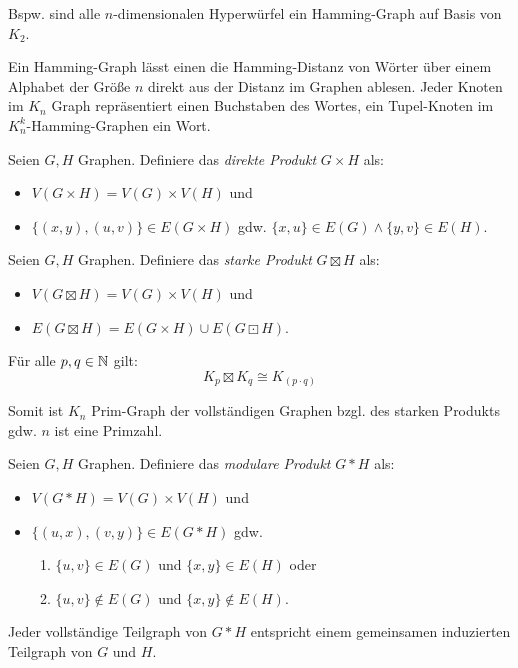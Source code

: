 \begin{remark}
    Bspw. sind alle $ n $-dimensionalen Hyperwürfel ein Hamming-Graph auf Basis von $ K_2 $.

    Ein Hamming-Graph lässt einen die Hamming-Distanz von Wörter über einem Alphabet der Größe $ n $ direkt aus der Distanz im Graphen ablesen.
    Jeder Knoten im $ K_n $ Graph repräsentiert einen Buchstaben des Wortes, ein Tupel-Knoten im $ K_n^k $-Hamming-Graphen ein Wort.
\end{remark}

\begin{definition}
    Seien $ G, H $ Graphen.
    Definiere das \textit{direkte Produkt} $ G \times H $ als:
    \begin{itemize}
        \item $ V(G \times H) = V(G) \times V(H) $ und
        \item $ \{ (x, y), (u, v) \} \in E(G \times H) $ gdw. $ \{ x, u\} \in E(G) \land \{ y, v \} \in E(H) $.
    \end{itemize}
\end{definition}

\begin{definition}
    Seien $ G, H $ Graphen.
    Definiere das \textit{starke Produkt} $ G \boxtimes H $ als:
    \begin{itemize}
        \item $ V(G \boxtimes H) = V(G) \times V(H) $ und
        \item $ E(G \boxtimes H) = E(G \times H) \cup E(G \boxdot H) $.
    \end{itemize}
\end{definition}

\begin{proposition}
    Für alle $ p, q \in \mathbb{N} $ gilt:
    \begin{equation*}
        K_p \boxtimes K_q \cong K_{(p \cdot q)}
    \end{equation*}

    Somit ist $ K_n $ Prim-Graph der vollständigen Graphen bzgl. des starken Produkts gdw. $ n $ ist eine Primzahl.
\end{proposition}

\begin{definition}
    Seien $ G, H $ Graphen.
    Definiere das \textit{modulare Produkt} $ G * H $ als:
    \begin{itemize}
        \item $ V(G * H) = V(G) \times V(H) $ und
        \item $ \{ (u, x), (v, y) \} \in E(G * H) $ gdw.
        \begin{enumerate}
            \item $ \{ u, v \} \in E(G) $ und $ \{ x, y \} \in E(H) $ oder
            \item $ \{ u, v \} \notin E(G) $ und $ \{ x, y \} \notin E(H) $.
        \end{enumerate}
    \end{itemize}
\end{definition}

\begin{remark}
    Jeder vollständige Teilgraph von $ G * H $ entspricht einem gemeinsamen induzierten Teilgraph von $ G $ und $ H $.
\end{remark}
